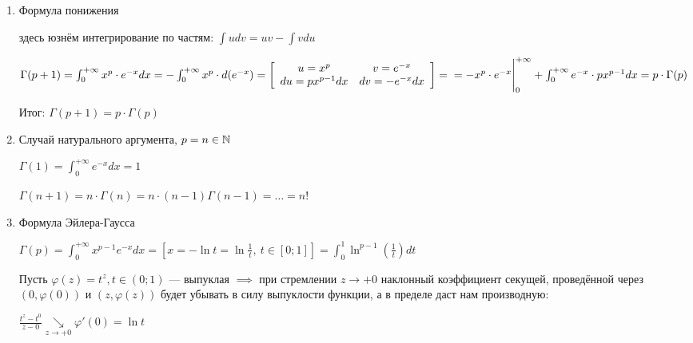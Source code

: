 \begin{enumerate}
    \item Формула понижения

          здесь юзнём интегрирование по частям: $\int udv = uv - \int vdu$

          $\Gamma(p + 1) = \int_0^{+\infty}x^p \cdot e^{-x}dx =
              -\int_0^{+\infty}x^p \cdot d(e^{-x}) =
              \left[
                  \begin{array}{cc}
                      u = x^p         & v = e^{-x}     \\
                      du = px^{p-1}dx & dv = -e^{-x}dx \\
                  \end{array}
                  \right] =
              \\
              = -x^p \cdot e^{-x} \Bigg|_0^{+\infty} + \int_0^{+\infty}
              e^{-x} \cdot px^{p-1}dx = p \cdot \Gamma(p)
          $

          Итог: $\Gamma(p + 1) = p \cdot \Gamma(p)$

    \item Случай натурального аргумента, $p = n \in \mathbb{N}$

          $\Gamma(1) = \int_0^{+\infty}e^{-x}dx = 1$

          $
              \Gamma(n + 1) = n \cdot \Gamma(n) = n \cdot (n - 1) \Gamma(n - 1) =
              \dots = n!
          $

    \item Формула Эйлера-Гаусса

          $
              \Gamma(p) = \int_0^{+\infty}x^{p - 1} e^{-x} dx = \left[x =
                  -\ln t = \ln\frac{1}{t}, ~ t \in [0; 1] \right] = \int_0^1
              \ln^{p - 1}\left(\frac{1}{t}\right) dt
          $

          \begin{minipage}{.50\textwidth}
              Пусть $\varphi(z) = t^z, t \in (0; 1)$ --- выпуклая $\implies$ при
              стремлении $z \to +0$ наклонный коэффициент секущей, проведённой
              через $(0, \varphi(0))$ и $(z, \varphi(z))$ будет убывать в силу выпуклости
              функции, а в пределе даст нам производную:

              $\frac{t^z - t^0}{z - 0} \underset{z \to +0}{\searrow} \varphi'(0) = \ln t$


\end{minipage}
\end{enumerate}
